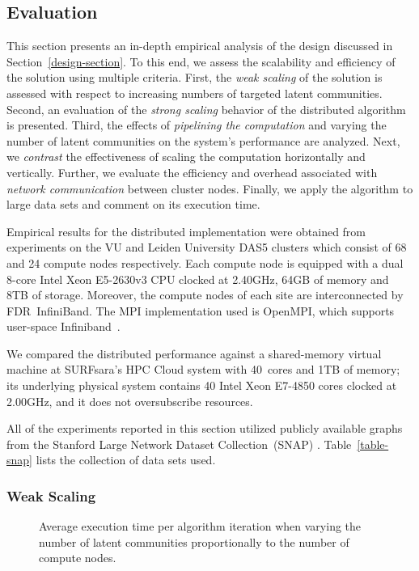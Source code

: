 \subsection{Evaluation}

This section presents an in-depth empirical analysis of the design discussed in
Section~\ref{design-section}. To this end, we assess the scalability and
efficiency of the solution using multiple criteria.
%
First, the \textit{weak scaling} of the solution is assessed with respect to increasing
numbers of targeted latent communities.
%
Second, an evaluation of the \textit{strong scaling} behavior of the distributed
algorithm is presented.
%
Third, the effects of \textit{pipelining the computation} and varying the number of latent communities on the system's
performance are analyzed.
%
Next, we \textit{contrast} the effectiveness of scaling the computation horizontally
and vertically.
%
Further, we evaluate the efficiency and overhead associated with \textit{network
communication} between cluster nodes.
%
Finally, we apply the algorithm to large data sets and comment on its execution time.

Empirical results for the distributed implementation were obtained from experiments on the VU and
Leiden University
DAS5 clusters which consist of 68 and 24 compute nodes respectively. Each
compute node is equipped with a dual 8-core Intel Xeon E5-2630v3 CPU clocked
at 2.40GHz, 64GB of memory and 8TB of storage. Moreover, the compute nodes of
each site are interconnected by
FDR~InfiniBand. The MPI implementation used is OpenMPI, which supports
user-space Infiniband~\cite{gabriel04:_open_mpi}.

We compared the distributed performance against a shared-memory virtual machine
at SURFsara's HPC Cloud system with 40~cores and 1TB of memory; its underlying
physical system contains 40 Intel Xeon E7-4850 cores clocked at 2.00GHz, and
it does not oversubscribe resources.

All of the experiments reported in this section utilized
publicly available graphs from the Stanford Large Network Dataset
Collection~(SNAP) \cite{snapnets}. Table~\ref{table-snap} lists the
collection of data sets used.

\subsubsection{Weak Scaling}

\begin{figure}[tb] %
  \centering
  \caption{Average execution time per algorithm iteration when varying
  the number of latent communities proportionally to the number of compute
  nodes.}
  \label{fig-weak-scaling}
\end{figure}

